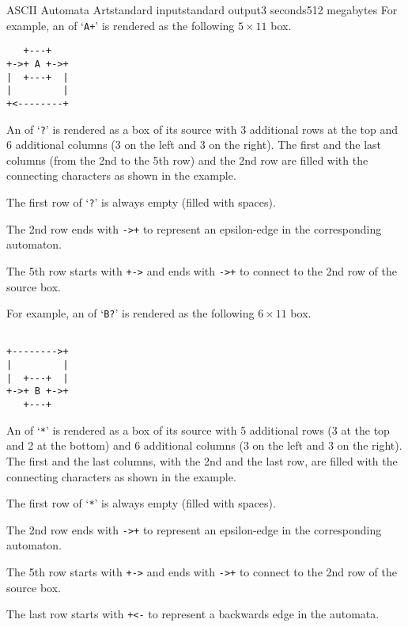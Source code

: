 \begin{problem}{ASCII Automata Art}{standard input}{standard output}{3 seconds}{512 megabytes}
For example, an  of `\texttt{A+}'
is rendered as the following $5 \times 11$ box. 

\begin{verbatim}
   +---+      
+->+ A +->+
|  +---+  |   
|         |   
+<--------+   
\end{verbatim}

An  of  `\texttt{?}'  is rendered as a box of its source  with 3 additional rows at the top and 6 additional columns (3 on the left and 3 on the right). The first and the last columns (from the 2nd to the 5th row) and the 2nd row are filled with the connecting characters as shown in the example. 

\begin{shortitems}
\item The first row of  `\texttt{?}' is always empty (filled with spaces).
\item The 2nd row ends with \texttt{->+} to represent an epsilon-edge in the corresponding automaton.
\item The 5th row starts with \texttt{+->} and ends with \texttt{->+} to connect to the 2nd row of the source  box.
\end{shortitems}

For example, an  of `\texttt{B?}'
is rendered as the following $6 \times 11$ box. 

\begin{verbatim}
                 
+-------->+
|         |   
|  +---+  |   
+->+ B +->+   
   +---+       
\end{verbatim}

An  of  `\texttt{*}'  is rendered as a box of its source  with 5 additional rows (3 at the top and 2 at the bottom) and 6 additional columns (3 on the left and 3 on the right). The first and the last columns, with the 2nd and the last row, are filled with the connecting characters as shown in the example. 

\begin{shortitems}
\item The first row of  `\texttt{*}' is always empty (filled with spaces).
\item The 2nd row ends with \texttt{->+} to represent an epsilon-edge in the corresponding automaton.
\item The 5th row starts with \texttt{+->} and ends with \texttt{->+} to connect to the 2nd row of the source  box.
\item The last row starts with \texttt{+<-} to represent a backwards edge in the automata. 
\end{shortitems}


\end{problem}
